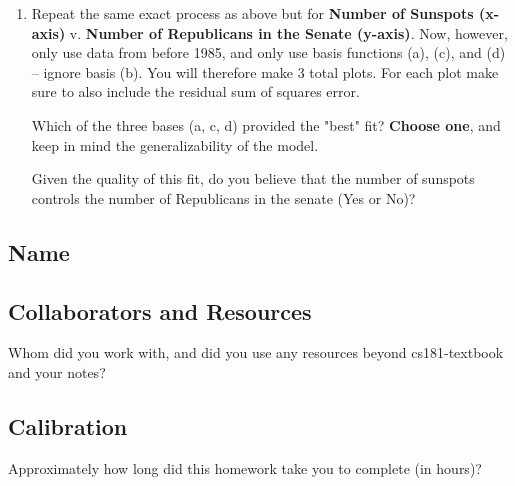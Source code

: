 \documentclass[submit]{harvardml}
\begin{document}
\begin{problem}
\begin{enumerate}
First, plot the data and regression lines for each of the following sets of basis functions, and include
the generated plot as an image in your submission PDF. You will therefore make 4 total plots:
\begin{enumerate}
	\item[(a)] $\phi_j(x) = x^j$ for $j=1, \ldots, 5$\\
    ie, use basis $y = a_1 x^1 + a_2 x^2 + a_3 x^3 + a_4 x^4 + a_5 x^5$ for some constants $\{a_1, ..., a_5\}$. 
    \item[(b)] $\phi_j(x) = \exp{\frac{-(x-\mu_j)^2}{25}}$ for $\mu_j=1960, 1965, 1970, 1975, \ldots 2010$
	\item[(c)] $\phi_j(x) = \cos(x / j)$ for $j=1, \ldots, 5$
	\item[(d)] $\phi_j(x) = \cos(x / j)$ for $j=1, \ldots, 25$
\end{enumerate}
\vspace{-2mm}
{\footnotesize * Note: Be sure to add a bias term for each of the basis functions above.}

Second, for each plot include the residual sum of squares error.

\item Repeat the same exact process as above but for \textbf{Number of Sunspots (x-axis)} v. \textbf{Number of Republicans in the Senate (y-axis)}. Now, however, only use data from before 1985, and only use basis functions (a), (c), and (d) -- ignore basis (b). You will therefore make 3 total plots. For each plot make sure to also include the residual sum of squares error.

Which of the three bases (a, c, d) provided the "best" fit? \textbf{Choose one}, and keep in mind the generalizability of the model. 

Given the quality of this fit, do you believe that the number of sunspots controls the number of Republicans in the senate (Yes or No)?

\end{enumerate}

\end{problem}



\newpage
\subsection*{Name}

\subsection*{Collaborators and Resources}
Whom did you work with, and did you use any resources beyond cs181-textbook and your notes?

\subsection*{Calibration}
Approximately how long did this homework take you to complete (in hours)? 
\end{document}
